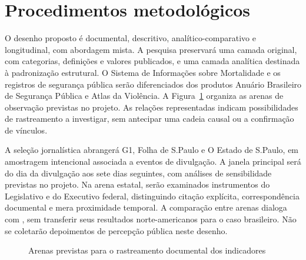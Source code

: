 \section{Procedimentos metodológicos}

O desenho proposto é documental, descritivo, analítico-comparativo e longitudinal, com abordagem mista. A pesquisa preservará uma camada original, com categorias, definições e valores publicados, e uma camada analítica destinada à padronização estrutural. O Sistema de Informações sobre Mortalidade e os registros de segurança pública serão diferenciados dos produtos Anuário Brasileiro de Segurança Pública e Atlas da Violência. A Figura~\ref{fig:arenas-documentais} organiza as arenas de observação previstas no projeto. As relações representadas indicam possibilidades de rastreamento a investigar, sem antecipar uma cadeia causal ou a confirmação de vínculos.

A seleção jornalística abrangerá G1, Folha de S.Paulo e O Estado de S.Paulo, em amostragem intencional associada a eventos de divulgação. A janela principal será do dia da divulgação aos sete dias seguintes, com análises de sensibilidade previstas no projeto. Na arena estatal, serão examinados instrumentos do Legislativo e do Executivo federal, distinguindo citação explícita, correspondência documental e mera proximidade temporal. A comparação entre arenas dialoga com , sem transferir seus resultados norte-americanos para o caso brasileiro. Não se coletarão depoimentos de percepção pública neste desenho.

\begin{figure}[htb]
\caption{Arenas previstas para o rastreamento documental dos indicadores}
\label{fig:arenas-documentais}
\centering
{}
\end{figure}
